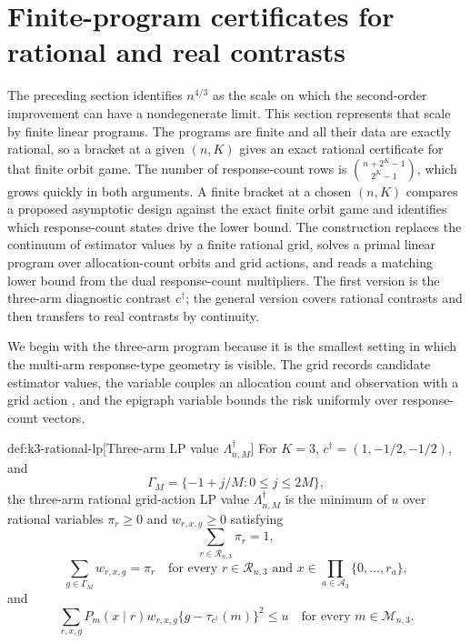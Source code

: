 \section{Finite-program certificates for rational and real contrasts}\label{sec:programs}

The preceding section identifies \(n^{4/3}\) as the scale on which the second-order improvement can have a nondegenerate limit. This section represents that scale by finite linear programs. The programs are finite and all their data are exactly rational, so a bracket at a given \((n,K)\) gives an exact rational certificate for that finite orbit game. The number of response-count rows is \(\binom{n+2^K-1}{2^K-1}\), which grows quickly in both arguments. A finite bracket at a chosen \((n,K)\) compares a proposed asymptotic design against the exact finite orbit game and identifies which response-count states drive the lower bound. The construction replaces the continuum of estimator values by a finite rational grid, solves a primal linear program over allocation-count orbits and grid actions, and reads a matching lower bound from the dual response-count multipliers. The first version is the three-arm diagnostic contrast \(c^\dagger\); the general version covers rational contrasts and then transfers to real contrasts by continuity.

We begin with the three-arm program because it is the smallest setting in which the multi-arm response-type geometry is visible. The grid  records candidate estimator values, the variable  couples an allocation count and observation with a grid action , and the epigraph variable  bounds the risk uniformly over response-count vectors.

\begin{definitionv}{def:k3-rational-lp}[Three-arm LP value $\Lambda_{n,M}^\dagger$]
For \(K=3\), \(c^\dagger=(1,-1/2,-1/2)\), and
\[
\Gamma_M=\{-1+j/M:0\le j\le 2M\},
\]
the three-arm rational grid-action LP value \(\Lambda_{n,M}^\dagger\) is the minimum of \(u\) over rational variables \(\pi_r\ge 0\) and \(w_{r,x,g}\ge 0\) satisfying
\[
\sum_{r\in\mathcal R_{n,3}}\pi_r=1,
\]
\[
\sum_{g\in\Gamma_M}w_{r,x,g}=\pi_r
\quad
\text{for every } r\in\mathcal R_{n,3}
\text{ and } x\in\prod_{a\in\mathcal A_3}\{0,\ldots,r_a\},
\]
and
\[
\sum_{r,x,g}P_m(x\mid r)w_{r,x,g}\{g-\tau_{c^\dagger}(m)\}^2\le u
\quad
\text{for every } m\in\mathcal M_{n,3}.
\]
\end{definitionv}


